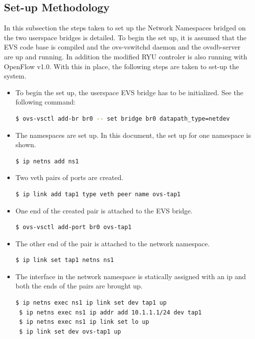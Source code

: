 \subsection{Set-up Methodology}
In this subsection the steps taken to set up the Network Namespaces bridged on the two userspace bridges is detailed. To begin the set up, it is assumed that the EVS code base is compiled and the ovs-vswitchd daemon and the ovsdb-server are up and running. In addition the modified RYU controler is also running with OpenFlow v1.0.  With this in place, the following steps are taken to set-up the system.
\begin{itemize}
\item To begin the set up, the userspace EVS bridge has to be initialized. \noindent See the following command:
 \begin{lstlisting}[language=bash]
 $ ovs-vsctl add-br br0 -- set bridge br0 datapath_type=netdev \end{lstlisting}
\end{itemize}
\begin{itemize}
 \item The namespaces are set up. In this document, the set up for one namespace is shown.
 \begin{lstlisting}[language=bash]
 $ ip netns add ns1 \end{lstlisting}
\end{itemize}
\begin{itemize}
 \item Two veth pairs of ports are created.
 \begin{lstlisting}[language=bash]
 $ ip link add tap1 type veth peer name ovs-tap1 \end{lstlisting}
\end{itemize}
\begin{itemize}
 \item One end of the created pair is attached to the EVS bridge.
 \begin{lstlisting}[language=bash]
 $ ovs-vsctl add-port br0 ovs-tap1 \end{lstlisting}
\end{itemize}
\begin{itemize}
 \item The other end of the pair is attached to the network namespace.
 \begin{lstlisting}[language=bash]
 $ ip link set tap1 netns ns1 \end{lstlisting}
\end{itemize}
\begin{itemize}
 \item The interface in the network namespace is statically assigned with an ip and both the ends of the pairs are brought up.
 \begin{lstlisting}[language=bash]
 $ ip netns exec ns1 ip link set dev tap1 up
 $ ip netns exec ns1 ip addr add 10.1.1.1/24 dev tap1
 $ ip netns exec ns1 ip link set lo up
 $ ip link set dev ovs-tap1 up \end{lstlisting}
\end{itemize}
